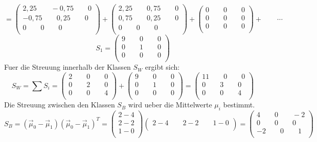 \documentclass{article}
\begin{document}
\[
= 
\left(
\begin {array} {c}
2,25 \qquad -0,75 \qquad 0 \\
-0,75 \qquad 0,25 \qquad 0  \\
0 \qquad 0 \qquad 0  \\
\end {array}
\right)
+
\left(
\begin {array} {c}
2,25 \qquad 0,75 \qquad 0 \\
0,75 \qquad 0,25 \qquad 0  \\
0 \qquad 0 \qquad 0  \\
\end {array}
\right)
+
\left(
\begin {array} {c}
0 \qquad 0 \qquad 0  \\
0 \qquad 0 \qquad 0  \\
0 \qquad 0 \qquad 0  \\
\end {array}
\right)
+ \qquad \cdots
\]
\[
S_1 =
\left(
\begin {array} {c}
9 \qquad 0 \qquad 0  \\
0 \qquad 1 \qquad 0  \\
0 \qquad 0 \qquad 0  \\
\end {array}
\right)
\]
Fuer die Streuung innerhalb der Klassen $S_W$ ergibt sich:
\[
S_W = \sum{S_i} = 
\left(
\begin {array} {c}
2 \qquad 0 \qquad 0  \\
0 \qquad 2 \qquad 0  \\
0 \qquad 0 \qquad 4  \\
\end {array}
\right)
+
\left(
\begin {array} {c}
9 \qquad 0 \qquad 0  \\
0 \qquad 1 \qquad 0  \\
0 \qquad 0 \qquad 0  \\
\end {array}
\right)
=
\left(
\begin {array} {c}
11 \qquad 0 \qquad 0  \\
0 \qquad 3 \qquad 0  \\
0 \qquad 0 \qquad 4  \\
\end {array}
\right)
\]
Die Streuung zwischen den Klassen $S_B$ wird ueber die Mittelwerte $\mu_i$ bestimmt.
\[
S_B = (\vec{\mu}_0 - \vec{\mu}_1)(\vec{\mu}_0 - \vec{\mu}_1)^T = 
\left(
\begin {array} {c}
2 - 4 \\
2 - 2 \\
1 - 0 \\
\end {array}
\right)
\left(
\begin {array} {c}
2 - 4 \qquad 2 - 2 \qquad 1 - 0 \\
\end {array}
\right)
=
\left(
\begin {array} {c}
4 \qquad 0 \qquad -2  \\
0 \qquad 0 \qquad 0  \\
-2 \qquad 0 \qquad 1  \\
\end {array}
\right)
\]
\end{document}

